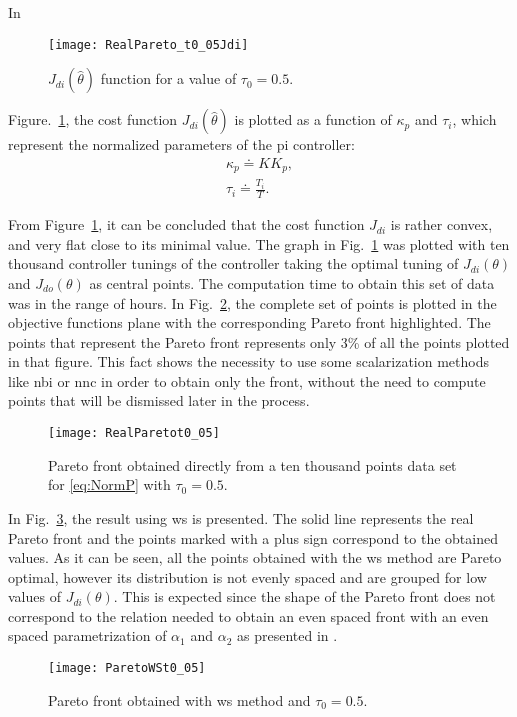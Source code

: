 In %
\begin{figure}[tb]%
	\centering
	\texttt{[image: RealPareto\_t0\_05Jdi]}%
	\caption{$J_{di}(\hat{\theta})$ function for a value of $\tau_0=0.5$.}%
	\label{fig:RealPareto_t0_05Jdi}%
\end{figure}
%
%
Figure.~\ref{fig:RealPareto_t0_05Jdi}, the cost function $J_{di}(\hat{\theta})$ is plotted as a function of $\kappa_p$ and $\tau_i$, which represent the normalized parameters of the \gls{pi} controller:
\begin{equation}
\begin{array}{c}
\kappa_p \doteq K K_p,\\
\tau_i \doteq \frac{T_i}{T}.
\end{array}
\label{eq:NormContrParam}
\end{equation}

From Figure~\ref{fig:RealPareto_t0_05Jdi}, it can be concluded that the cost function $J_{di}$ is rather convex, and very flat close to its minimal value. The graph in Fig.~\ref{fig:RealPareto_t0_05Jdi} was plotted with ten thousand controller tunings of the controller taking the optimal tuning of $J_{di}(\theta)$ and $J_{do}(\theta)$ as central points. The computation time to obtain this set of data was in the range of hours. In Fig.~\ref{fig:RealParetot0_05}, the complete set of points is plotted in the objective functions plane with the corresponding Pareto front highlighted. The points that represent the Pareto front represents only 3\% of all the points plotted in that figure. This fact shows the necessity to use some scalarization methods like \gls{nbi} or \gls{nnc} in order to obtain only the front, without the need to compute points that will be dismissed later in the process.
%
\begin{figure}[tb]%
\centering
\texttt{[image: RealParetot0\_05]} %
\caption{Pareto front obtained directly from a ten thousand points data set for \eqref{eq:NormP} with $\tau_0=0.5$.}%
\label{fig:RealParetot0_05}%
\end{figure}

In Fig.~\ref{fig:ParetoWSt0_05}, the result using \gls{ws} is presented. The solid line represents the real Pareto front and the points marked with a plus sign correspond to the obtained values. As it can be seen, all the points obtained with the \gls{ws} method are Pareto optimal, however its distribution is not evenly spaced and are grouped for low values of $J_{di}(\theta)$. This is expected since the shape of the Pareto front does not correspond to the relation needed to obtain an even spaced front with an even spaced parametrization of $\alpha_1$ and $\alpha_2$ as presented in \cite{Das1997}.
%
\begin{figure}[tb]%
\centering
\texttt{[image: ParetoWSt0\_05]}%
\caption{Pareto front obtained with \gls{ws} method and $\tau_0=0.5$.}%
\label{fig:ParetoWSt0_05}%
\end{figure}


